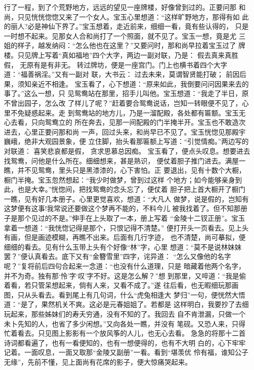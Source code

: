 行了一程，到了个荒野地方，远远的望见一座牌楼，好像曾到过的。正要问那
和尚，只见恍恍惚惚又来了一个女人。宝玉心里想道：“这样旷野地方，那得有如
此的丽人?必是神仙下界了。”宝玉想着，走近前来，细细一看，竟有些认得的，
只是一时想不起来。见那女人合和尚打了一个照面，就不见了。宝玉一想，竟是尤
三姐的样子，越发纳闷：“怎么他也在这里？”又要问时，那和尚早拉着宝玉过了
牌楼。只见牌上写着“真如福地”四个大字，两边一副对联，乃是：
假去真来真胜假，
无原有是有非无。
转过牌坊，便是一座宫门。门上也横书着四个大字道：“福善祸淫。”又有一副对
联，大书云：
过去未来，莫谓智贤能打破；
前因后果，须知亲近不相逢。
宝玉看了，心下想道：“原来如此，我倒要问问因果来去的事了。”这么一想，只
见鸳鸯站在那里，招手儿叫他。宝玉想道：“我走了半日，原不曾出园子，怎么改
了样儿了呢？”赶着要合鸳鸯说话，岂知一转眼便不见了，心里不免疑惑起来。走
到鸳鸯站的地方儿，乃是一溜配殿，各处都有匾额。宝玉无心去看，只向鸳鸯立的
所在奔去，见那一间配殿的门半掩半开。宝玉也不敢造次进去，心里正要问那和尚
一声，回过头来，和尚早已不见了。宝玉恍惚见那殿宇巍峨，绝非大观园景象，便
立住脚，抬头看那匾额上写道：“引觉情痴。”两边写的对联道：
喜笑悲哀都是假，
贪求思慕总因痴。
宝玉看了，便点头叹息。想要进去找鸳鸯，问他是什么所在。细细想来，甚是熟识，
便仗着胆子推门进去。满屋一瞧，并不见鸳鸯，里头只是黑漆漆的，心下害怕。正
要退出，见有十数个大橱，橱门半掩。宝玉忽然想起：“我少时做梦，曾到过这样
个地方；如今能够亲身到此，也是大幸。”恍惚间，把找鸳鸯的念头忘了，便仗着
胆子把上首大橱开了橱门一瞧，见有好几本册子。心里更觉喜欢，想道：“大凡人
做梦，说是假的，岂知有这梦便有这事!我常说还要做这个梦再不能的，不料今儿
被我找着了。但不知那册子是那个见过的不是。”伸手在上头取了一本，册上写着
“金陵十二钗正册”。宝玉拿着一想道：“我恍惚记得是那个，只恨记得不清楚。”
便打开头一页看去。见上头有画，但是画迹模糊，再瞧不出来。后面有几行字迹，
也不清楚，尚可摹拟，便细细的看去。见有什么玉带上头有个好像“林”字，心里
想道：“莫不是说林妹妹罢？”便认真看去。底下又有“金簪雪里”四字，诧异道：
“怎么又像他的名字呢？”复将前后四句合起来一念道：“也没有什么道理，只是
暗藏着他两个名字，并不为奇。独有那‘怜’字‘叹’字不好。这是怎么解？”想
到那里，又啐道：“我是偷着看，若只管呆想起来，倘有人来，又看不成了。”遂
往后看，也无暇细玩那画图，只从头看去。看到尾上有几句词，什么“虎兔相逢大
梦归”一句，便恍然大悟道：“是了，果然机关不爽。这必是元春姐姐了。若都是
这样明白，我要抄了去细玩起来，那些姊妹们的寿夭穷通，没有不知的了。我回去
自不肯泄漏，只做一个未卜先知的人，也省了多少闲想。”又向各处一瞧，并没有
笔砚。又恐人来，只得忙着看去。只见图上影影有一个放风筝的人儿，也无心去看。
急急的将那十二首诗词都看遍了，也有一看便知的，也有一想便得的，也有不大明
白的，心下牢牢记着。一面叹息，一面又取那“金陵又副册”一看。看到“堪羡优
伶有福，谁知公子无缘”，先前不懂，见上面尚有花席的影子，便大惊痛哭起来。

